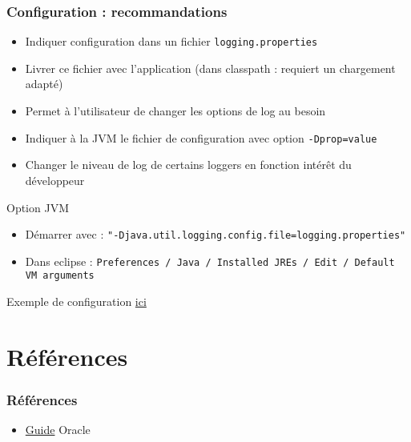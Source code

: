 \documentclass[english, french]{beamer}
\begin{document}
\begin{frame}[fragile]
	\frametitle{Configuration : recommandations}
	\begin{itemize}
		\item Indiquer configuration dans un fichier \texttt{logging.properties}
		\item Livrer ce fichier avec l’application {\tiny (dans classpath : requiert un chargement adapté)}
		\item Permet à l’utilisateur de changer les options de log au besoin
		\item Indiquer à la JVM le fichier de configuration avec option \texttt{-Dprop=value}
		\item Changer le niveau de log de certains loggers en fonction intérêt du développeur
	\end{itemize}
	\begin{block}{Option JVM}
		\begin{itemize}
			\item Démarrer avec : {\small\texttt{"-Djava.util.logging.config.file=logging.properties"}}
			\item Dans eclipse : \texttt{Preferences / Java / Installed JREs / Edit / Default VM arguments}\vspace{-1pt}
		\end{itemize}
	\end{block}
	Exemple de configuration \href{https://github.com/oliviercailloux/jee/blob/master/Sample/logging.properties}{ici}
\end{frame}

\section{Références}
\begin{frame}
	\frametitle{Références}
	\begin{itemize}
		\item \href{https://docs.oracle.com/javase/8/docs/technotes/guides/logging/overview.html}{Guide} Oracle
	\end{itemize}
\end{frame}

\appendix
\end{document}
